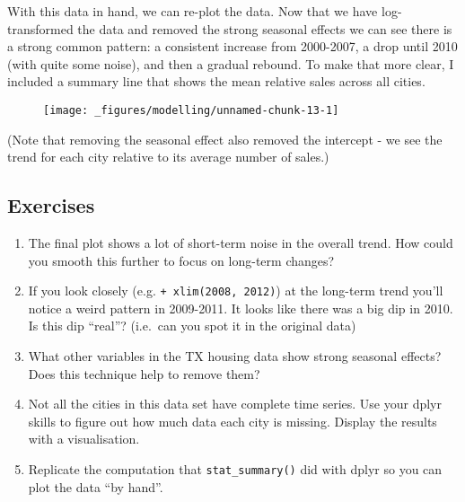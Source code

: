 With this data in hand, we can re-plot the data. Now that we have
log-transformed the data and removed the strong seasonal effects we can
see there is a strong common pattern: a consistent increase from
2000-2007, a drop until 2010 (with quite some noise), and then a gradual
rebound. To make that more clear, I included a summary line that shows
the mean relative sales across all cities.

\begin{Shaded}
\begin{Highlighting}[]
\StringTok{  }\NormalTok{(}\NormalTok{(}  \NormalTok{/}\NormalTok{) +}\StringTok{ }
\StringTok{  }\NormalTok{(} \NormalTok{, } \NormalTok{, } \NormalTok{)}
\end{Highlighting}
\end{Shaded}

\begin{figure}[H]
  \texttt{[image: \_figures/modelling/unnamed-chunk-13-1]}
\end{figure}

(Note that removing the seasonal effect also removed the intercept - we
see the trend for each city relative to its average number of sales.)

\subsection{Exercises}

\begin{enumerate}
\def\labelenumi{\arabic{enumi}.}
\item
  The final plot shows a lot of short-term noise in the overall trend.
  How could you smooth this further to focus on long-term changes?
\item
  If you look closely (e.g. \texttt{+\ xlim(2008,\ 2012)}) at the
  long-term trend you'll notice a weird pattern in 2009-2011. It looks
  like there was a big dip in 2010. Is this dip ``real''? (i.e.~can you
  spot it in the original data)
\item
  What other variables in the TX housing data show strong seasonal
  effects? Does this technique help to remove them?
\item
  Not all the cities in this data set have complete time series. Use
  your dplyr skills to figure out how much data each city is missing.
  Display the results with a visualisation.
\item
  Replicate the computation that \texttt{stat\_summary()} did with dplyr
  so you can plot the data ``by hand''.
\end{enumerate}

